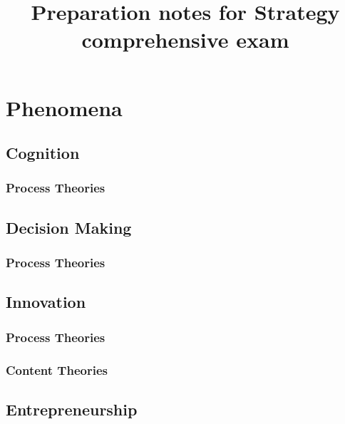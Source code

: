 \documentclass[12pt,letterpaper]{article}
\begin{document}
\setlength{\droptitle}{-5em}
\title{Preparation notes for Strategy comprehensive exam}
\date{\vspace{-12ex}}
\maketitle

\begin{comment}
\begin{abstract} 
\normalsize 
\end{abstract}
{\textbf{Keywords:} \\\indent }
\end{comment}

\pagestyle{fancy}
\fancyhf{}
\rhead{\thepage}

\section{Phenomena}

\subsection{Cognition}
\subsubsection{Process Theories}

\subsection{Decision Making}
\subsubsection{Process Theories}

\subsection{Innovation}
\subsubsection{Process Theories}
\subsubsection{Content Theories}

\subsection{Entrepreneurship}
\end{document}
